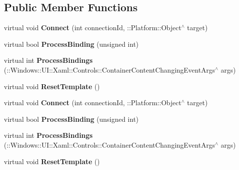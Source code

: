 \subsection*{Public Member Functions}
\begin{DoxyCompactItemize}
\item 
\mbox{\label{class_xaml_binding_info_1_1_xaml_bindings_a949c24e21bb4968df1e313ab1a29ca0f}} 
virtual void {\bfseries Connect} (int connection\+Id, \+::Platform\+::\+Object$^\wedge$ target)
\item 
\mbox{\label{class_xaml_binding_info_1_1_xaml_bindings_a596997845905d809ae11b635aef345e0}} 
virtual bool {\bfseries Process\+Binding} (unsigned int)
\item 
\mbox{\label{class_xaml_binding_info_1_1_xaml_bindings_aa19559351b48ed6444cac4b04364cc4c}} 
virtual int {\bfseries Process\+Bindings} (\+::Windows\+::\+U\+I\+::\+Xaml\+::\+Controls\+::\+Container\+Content\+Changing\+Event\+Args$^\wedge$ args)
\item 
\mbox{\label{class_xaml_binding_info_1_1_xaml_bindings_a35fa732801c8eb428cf9662ff8771d9f}} 
virtual void {\bfseries Reset\+Template} ()
\item 
\mbox{\label{class_xaml_binding_info_1_1_xaml_bindings_a949c24e21bb4968df1e313ab1a29ca0f}} 
virtual void {\bfseries Connect} (int connection\+Id, \+::Platform\+::\+Object$^\wedge$ target)
\item 
\mbox{\label{class_xaml_binding_info_1_1_xaml_bindings_a596997845905d809ae11b635aef345e0}} 
virtual bool {\bfseries Process\+Binding} (unsigned int)
\item 
\mbox{\label{class_xaml_binding_info_1_1_xaml_bindings_aa19559351b48ed6444cac4b04364cc4c}} 
virtual int {\bfseries Process\+Bindings} (\+::Windows\+::\+U\+I\+::\+Xaml\+::\+Controls\+::\+Container\+Content\+Changing\+Event\+Args$^\wedge$ args)
\item 
\mbox{\label{class_xaml_binding_info_1_1_xaml_bindings_a35fa732801c8eb428cf9662ff8771d9f}} 
virtual void {\bfseries Reset\+Template} ()
\end{DoxyCompactItemize}


